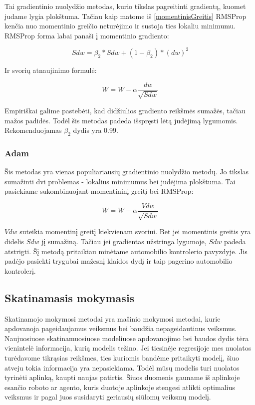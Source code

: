 \documentclass[a4paper, 12pt]{article}
\begin{document}
Tai gradientinio nuolydžio metodas, kurio tikslas pagreitinti gradientą, kuomet judame lygia plokštuma. Tačiau kaip matome iš \ref{momentinisGreitis} RMSProp kenčia nuo momentinio greičio neturėjimo ir sustoja ties lokaliu minimumu. RMSProp forma labai panaši į momentinio gradiento:

\begin{equation}
S d w=\beta_{2} * S d w+\left(1-\beta_{2}\right) *(d w)^{2}
\end{equation}

Ir svorių atnaujinimo formulė:

\begin{equation}
W=W-\alpha \frac{d w}{\sqrt{S d w}}
\end{equation}

Empiriškai galime pastebėti, kad didžiulios gradiento reikšmės sumažės, tačiau mažos padidės. Todėl šis metodas padeda išspręsti lėtą judėjimą lygumomis. Rekomenduojamas $\beta_2$ dydis yra 0.99.

%
\subsubsection{Adam}
%

Šis metodas yra vienas populiariausių gradientinio nuolydžio metodų. Jo tikslas sumažinti dvi problemas - lokalius minimumus bei judėjima plokštuma. Tai pasiekiame sukombinuojant momentininį greitį bei RMSProp:

\begin{equation}
W=W-\alpha \frac{V d w}{\sqrt{S d w}}
\end{equation}

$Vdw$ suteikia momentinį greitį kiekvienam svoriui. Bet jei momentinis greitis yra didelis $Sdw$ jį sumažiną. Tačiau jei gradientas užstringa lygumoje, $Sdw$ padeda atstrigti.
Šį metodą pritaikiau minėtame automobilio kontrolerio pavyzdyje. Jis padėjo pasiekti trygubai mažesnį klaidos dydį ir taip pagerino automobilio kontrolerį.


%
\subsection{Skatinamasis mokymasis}
%

Skatinamojo mokymosi metodai yra mašinio mokymosi metodai, kurie apdovanoja pageidaujamus veiksmus bei baudžia nepageidautinus veiksmus. Naujuosiuose skatinamuosiuose modeliuose apdovanojimo bei baudos dydis tėra vienintelė informacija, kurią modelis težino. Jei tiesinėje regresijoje mes nuolatos turėdavome tikrąsias reikšmes, ties kuriomis bandėme pritaikyti modelį, šiuo atveju tokia informacija yra nepasiekiama. Todėl mūsų modelis turi nuolatos tyrinėti aplinką, kaupti naujas patirtis. Šiuos duomenis gauname iš aplinkoje esančio roboto ar agento, kuris duotoje aplinkoje stengesi atlikti optimalius veiksmus ir pagal juos susidaryti geriausių siūlomų veiksmų modelį. 
\end{document}
